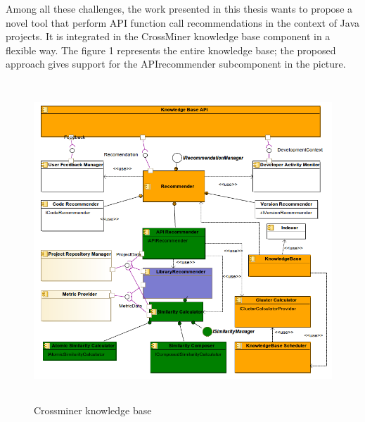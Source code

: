 Among all these challenges, the work presented in this thesis wants to propose a novel tool that perform API function call recommendations in the context of Java projects. It is integrated in the CrossMiner knowledge base component in a flexible way. The figure 1 represents the entire knowledge base; the proposed approach gives support for the APIrecommender subcomponent in the picture.

\begin{figure}[H]
\includegraphics[width=12cm,height=12cm,keepaspectratio]{images/Kb.png}
\centering
\caption{Crossminer knowledge base}
\label{fig:cmd}
\end{figure}

